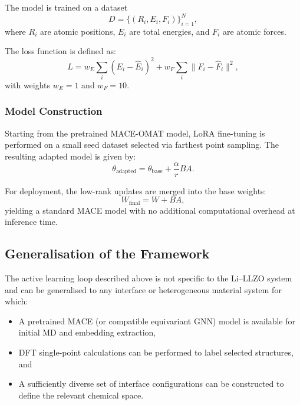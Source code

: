 \documentclass[12pt,a4paper,oneside]{book}
\begin{document}
The model is trained on a dataset
\begin{equation}
D = \{(R_i, E_i, F_i)\}_{i=1}^{N},
\end{equation}
where $R_i$ are atomic positions, $E_i$ are total energies, and $F_i$ are atomic forces.

The loss function is defined as:
\begin{equation}
L =
w_E \sum_i (E_i - \hat{E}_i)^2 +
w_F \sum_i \|F_i - \hat{F}_i\|^2,
\end{equation}
with weights $w_E = 1$ and $w_F = 10$.

\subsubsection{Model Construction}

Starting from the pretrained MACE-OMAT model, LoRA fine-tuning is performed on a small seed dataset selected via farthest point sampling. The resulting adapted model is given by:
\begin{equation}
\theta_{\text{adapted}} =
\theta_{\text{base}} +
\frac{\alpha}{r} BA.
\end{equation}

For deployment, the low-rank updates are merged into the base weights:
\begin{equation}
W_{\text{final}} = W + BA,
\end{equation}
yielding a standard MACE model with no additional computational overhead at inference time.

\subsection{Generalisation of the Framework}

The active learning loop described above is not specific to the Li--LLZO
system and can be generalised to any interface or heterogeneous material
system for which:
\begin{itemize}
    \item A pretrained MACE (or compatible equivariant GNN) model
    is available for initial MD and embedding extraction,
    \item DFT single-point calculations can be performed to label
    selected structures, and
    \item A sufficiently diverse set of interface configurations can
    be constructed to define the relevant chemical space.
\end{itemize}
\end{document}
